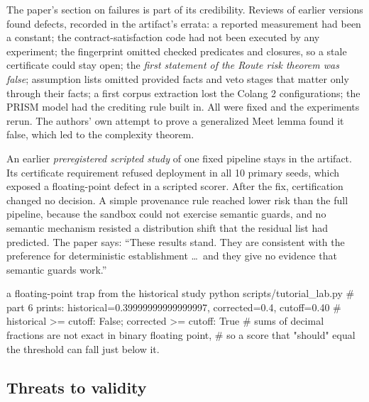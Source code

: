 The paper's section on failures is part of its credibility. Reviews of earlier versions found defects, recorded in the artifact's errata: a reported measurement had been a constant; the contract-satisfaction code had not been executed by any experiment; the fingerprint omitted checked predicates and closures, so a stale certificate could stay open; the \emph{first statement of the Route risk theorem was false}; assumption lists omitted provided facts and veto stages that matter only through their facts; a first corpus extraction lost the Colang 2 configurations; the PRISM model had the crediting rule built in. All were fixed and the experiments rerun. The authors' own attempt to prove a generalized Meet lemma found it false, which led to the complexity theorem.

An earlier \emph{preregistered scripted study} of one fixed pipeline stays in the artifact. Its certificate requirement refused deployment in all 10 primary seeds, which exposed a floating-point defect in a scripted scorer. After the fix, certification changed no decision. A simple provenance rule reached lower risk than the full pipeline, because the sandbox could not exercise semantic guards, and no semantic mechanism resisted a distribution shift that the residual list had predicted. The paper says: ``These results stand. They are consistent with the preference for deterministic establishment \dots\ and they give no evidence that semantic guards work.''

\begin{tryit}{a floating-point trap from the historical study}
python scripts/tutorial_lab.py
# part 6 prints:  historical=0.39999999999999997, corrected=0.4, cutoff=0.40
#                 historical >= cutoff: False; corrected >= cutoff: True
# sums of decimal fractions are not exact in binary floating point,
# so a score that "should" equal the threshold can fall just below it.
\end{tryit}

\subsection{Threats to validity}

